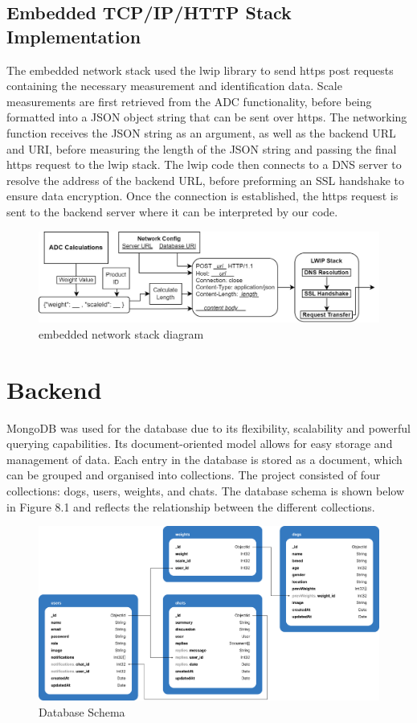 \subsection{Embedded TCP/IP/HTTP Stack Implementation}
The embedded network stack used the lwip library to send https post requests containing the necessary measurement and identification data. Scale measurements are first retrieved from the ADC functionality, before being formatted into a JSON object string that can be sent over https. The networking function receives the JSON string as an argument, as well as the backend URL and URI, before measuring the length of the JSON string and passing the final https request to the lwip stack. The lwip code then connects to a DNS server to resolve the address of the backend URL, before preforming an SSL handshake to ensure data encryption. Once the connection is established, the https request is sent to the backend server where it can be interpreted by our code.

\begin{figure}[h]
\centering
\includegraphics[width=\textwidth]{final-report/assets/network stack diagram.jpg}
\caption{embedded network stack diagram}
\end{figure}


\section{Backend}
MongoDB was used for the database due to its flexibility, scalability and powerful querying capabilities. Its document-oriented model allows for easy storage and management of data. Each entry in the database is stored as a document, which can be grouped and organised into collections. The project consisted of four collections: dogs, users, weights, and chats. The database schema is shown below in Figure 8.1 and reflects the relationship between the different collections.

\begin{figure}[h]
\centering
\includegraphics[width=\textwidth]{final-report/assets/databse_schema.png}
\caption{Database Schema}
\end{figure}

